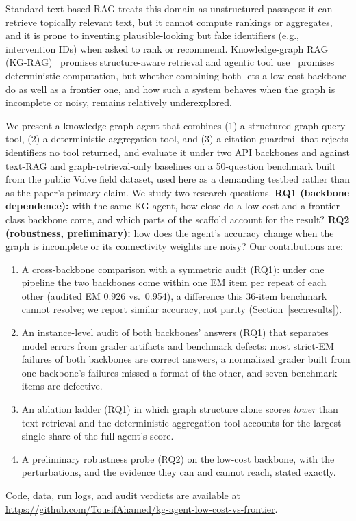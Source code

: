 \documentclass{article}
\begin{document}
Standard text-based RAG treats this domain as unstructured passages: it can
retrieve topically relevant text, but it cannot compute rankings or
aggregates, and it is prone to inventing plausible-looking but fake
identifiers (e.g., intervention IDs) when asked to rank or recommend.
Knowledge-graph RAG
(KG-RAG)~\cite{lewis2020rag,edge2024graphrag,sanmartin2024kgrag,pan2024roadmap}
promises structure-aware retrieval and agentic tool
use~\cite{yao2023react,schick2023toolformer} promises deterministic
computation, but whether combining both lets a low-cost backbone do as well as
a frontier one, and how such a system behaves when the graph is incomplete or
noisy, remains relatively underexplored.

We present a knowledge-graph agent that combines (1) a structured graph-query
tool, (2) a deterministic aggregation tool, and (3) a citation guardrail that
rejects identifiers no tool returned, and evaluate it under two API backbones
and against text-RAG and graph-retrieval-only baselines on a 50-question
benchmark built from the public Volve field dataset, used here as a demanding
testbed rather than as the paper's primary claim. We study two research
questions. \textbf{RQ1 (backbone dependence):} with the same KG agent, how close
do a low-cost and a frontier-class backbone come, and which parts of the
scaffold account for the result? \textbf{RQ2 (robustness, preliminary):} how
does the agent's accuracy change when the graph is incomplete or its
connectivity weights are noisy? Our contributions are:

\begin{enumerate}
  \item A cross-backbone comparison with a symmetric audit (RQ1): under one
  pipeline the two backbones come within one EM item per repeat of each other
  (audited EM 0.926 vs.\ 0.954), a difference this 36-item benchmark cannot
  resolve; we report similar accuracy, not parity
  (Section~\ref{sec:results}).
  \item An instance-level audit of both backbones' answers (RQ1) that separates
  model errors from grader artifacts and benchmark defects: most strict-EM
  failures of both backbones are correct answers, a normalized grader built from
  one backbone's failures missed a format of the other, and seven benchmark
  items are defective.
  \item An ablation ladder (RQ1) in which graph structure alone scores
  \emph{lower} than text retrieval and the deterministic aggregation tool
  accounts for the largest single share of the full agent's score.
  \item A preliminary robustness probe (RQ2) on the low-cost backbone, with the
  perturbations, and the evidence they can and cannot reach, stated exactly.
\end{enumerate}
Code, data, run logs, and audit verdicts are available at
\url{https://github.com/TousifAhamed/kg-agent-low-cost-vs-frontier}.
\end{document}
